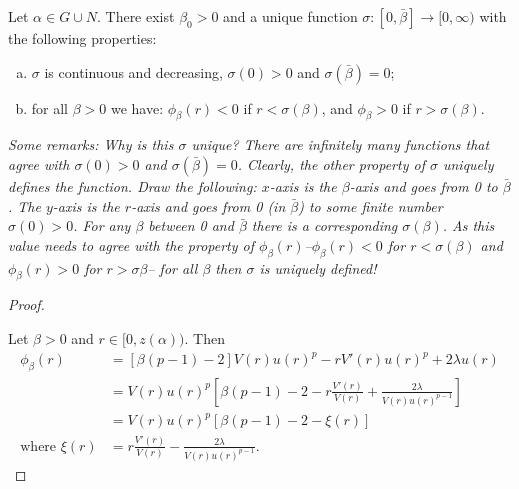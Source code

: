 
\newpage
\begin{lemma}
	Let $\alpha\in G\cup N$.
	There exist $\beta_0>0$ and a unique function
	$\sigma:[0,\bar\beta]\to[0,\infty)$ with the following properties:
	\begin{enumerate}[(a)]
		\item  $\sigma$ is continuous and decreasing,
		$\sigma(0)>0$ and $\sigma(\bar\beta)=0$;
    \item for all $\beta>0$ we have: $\phi_\beta(r)<0$ if $r<\sigma(\beta)$,
		and $\phi_\beta>0$ if $r>\sigma(\beta)$.
	\end{enumerate}

	\seperate

	\emph{Some remarks: Why is this $\sigma$ unique? There are infinitely many functions that agree with $\sigma(0)>0$ and $\sigma(\bar{\beta})=0$. Clearly, the other property of $\sigma$ uniquely defines the function. Draw the following: $x$-axis is the $\beta$-axis and goes from 0 to $\bar{\beta}$. The $y$-axis is the $r$-axis and goes from 0 (in $\bar{\beta}$) to some finite number $\sigma(0)>0$. For any $\beta$ between 0 and $\bar{\beta}$ there is a corresponding $\sigma(\beta)$. As this value needs to agree with the property of $\phi_{\beta}(r)$--$\phi_{\beta}(r)<0$ for $r<\sigma(\beta)$ and $\phi_{\beta}(r)>0$ for $r>\sigma{\beta}$-- for all $\beta$ then $\sigma$ is uniquely defined!}\\[11pt]


\begin{proof}
	\begin{outline}
		\1
		\1
		\1
		\1
	\end{outline}

\seperate

Let $\beta>0$ and $r\in[0,z(\alpha))$.
Then \begin{align*}
	\phi_{\beta}(r)&=\left[\beta(p-1)-2\right]V(r)u(r)^p-rV'(r)u(r)^p+2\lambda u(r) %
\\ &=V(r)u(r)^p\left[\beta(p-1)-2-r\frac{V'(r)}{V(r)}+\frac{2\lambda}{V(r)u(r)^{p-1}}\right]
\\ &= V(r)u(r)^p\left[\beta(p-1)-2-\xi(r)\right]
\\\text{where }\xi(r)&=r\frac{V'(r)}{V(r)}-\frac{2\lambda}{V(r)u(r)^{p-1}}.
\end{align*}


\end{proof}
\end{lemma}
